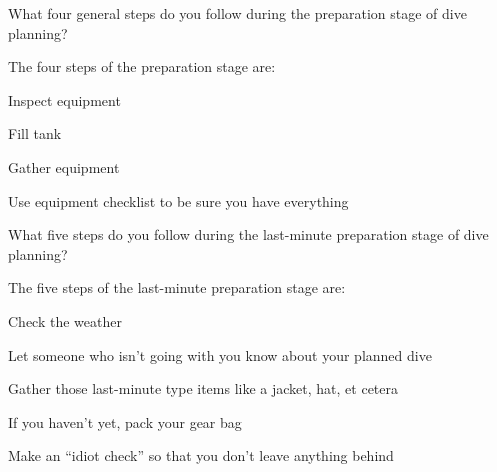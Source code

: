	\begin{qanda}
		\begin{question}
What four general steps do you follow during the preparation stage of dive planning?
		\end{question}

		\begin{answer}
The four steps of the preparation stage are:
			\begin{nospacenumberedlist}
				\item Inspect equipment
				\item Fill tank
				\item Gather equipment
				\item Use equipment checklist to be sure you have everything
			\end{nospacenumberedlist}
		\end{answer}
	\end{qanda}

	\begin{qanda}
		\begin{question}
What five steps do you follow during the last-minute preparation stage of dive planning?
		\end{question}

		\begin{answer}
The five steps of the last-minute preparation stage are:
			\begin{nospacenumberedlist}
				\item Check the weather
				\item Let someone who isn't going with you know about your planned dive
				\item Gather those last-minute type items like a jacket, hat, et cetera
				\item If you haven't yet, pack your gear bag
				\item Make an ``idiot check'' so that you don't leave anything behind
			\end{nospacenumberedlist}
		\end{answer}
	\end{qanda}

